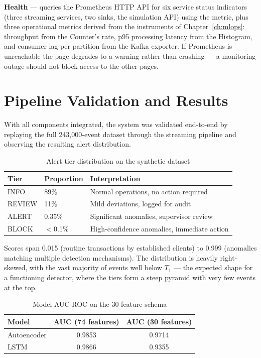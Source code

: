 \textbf{Health} --- queries the Prometheus HTTP API for six service status indicators (three streaming services, two sinks, the simulation API) using the  metric, plus three operational metrics derived from the instruments of Chapter~\ref{ch:mlops}: throughput from the Counter's rate, p95 processing latency from the Histogram, and consumer lag per partition from the Kafka exporter. If Prometheus is unreachable the page degrades to a warning rather than crashing --- a monitoring outage should not block access to the other pages.

\section{Pipeline Validation and Results}

With all components integrated, the system was validated end-to-end by replaying the full 243{,}000-event dataset through the streaming pipeline and observing the resulting alert distribution.

\begin{table}[htbp]
\centering
\small
\caption{Alert tier distribution on the synthetic dataset}
\begin{tabular}{@{}llp{6.5cm}@{}}
\toprule
\textbf{Tier} & \textbf{Proportion} & \textbf{Interpretation} \\
\midrule
INFO & 89\% & Normal operations, no action required \\
REVIEW & 11\% & Mild deviations, logged for audit \\
ALERT & 0.35\% & Significant anomalies, supervisor review \\
BLOCK & $<$0.1\% & High-confidence anomalies, immediate action \\
\bottomrule
\end{tabular}
\end{table}

Scores span 0.015 (routine transactions by established clients) to 0.999 (anomalies matching multiple detection mechanisms). The distribution is heavily right-skewed, with the vast majority of events well below $T_1$ --- the expected shape for a functioning detector, where the tiers form a steep pyramid with very few events at the top.

\begin{table}[htbp]
\centering
\small
\caption{Model AUC-ROC on the 30-feature schema}
\begin{tabular}{@{}lcc@{}}
\toprule
\textbf{Model} & \textbf{AUC (74 features)} & \textbf{AUC (30 features)} \\
\midrule
Autoencoder & 0.9853 & 0.9714 \\
LSTM & 0.9866 & 0.9355 \\
\bottomrule
\end{tabular}
\end{table}

